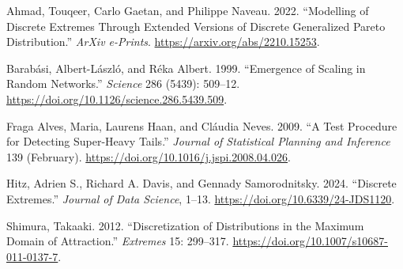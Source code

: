 \documentclass[
  10pt,
  a4paper,
]{scrreprt}
\newlength{\cslhangindent}
\newlength{\cslentryspacingunit} %
\newenvironment{CSLReferences}[2] %
 {%
  \setlength{\parindent}{0pt}
  \ifodd #1
  \let\oldpar\par
  \def\par{\hangindent=\cslhangindent\oldpar}
  \fi
  \setlength{\parskip}{#2\cslentryspacingunit}
 }%
 {}
\theoremstyle{plain}
\theoremstyle{definition}
\theoremstyle{remark}
\begin{document}
{\hypertarget{refs}{}
\begin{CSLReferences}{1}{0}
\leavevmode{}%
Ahmad, Touqeer, Carlo Gaetan, and Philippe Naveau. 2022. {``Modelling of
Discrete Extremes Through Extended Versions of Discrete Generalized
Pareto Distribution.''} \emph{ArXiv e-Prints}.
\url{https://arxiv.org/abs/2210.15253}.

\leavevmode{}%
Barabási, Albert-László, and Réka Albert. 1999. {``Emergence of Scaling
in Random Networks.''} \emph{Science} 286 (5439): 509--12.
\url{https://doi.org/10.1126/science.286.5439.509}.

\leavevmode{}%
Fraga Alves, Maria, Laurens Haan, and Cláudia Neves. 2009. {``A Test
Procedure for Detecting Super-Heavy Tails.''} \emph{Journal of
Statistical Planning and Inference} 139 (February).
\url{https://doi.org/10.1016/j.jspi.2008.04.026}.

\leavevmode{}%
Hitz, Adrien S., Richard A. Davis, and Gennady Samorodnitsky. 2024.
{``Discrete Extremes.''} \emph{Journal of Data Science}, 1--13.
\url{https://doi.org/10.6339/24-JDS1120}.

\leavevmode{}%
Shimura, Takaaki. 2012. {``Discretization of Distributions in the
Maximum Domain of Attraction.''} \emph{Extremes} 15: 299--317.
\url{https://doi.org/10.1007/s10687-011-0137-7}.

\end{CSLReferences}
\end{document}
